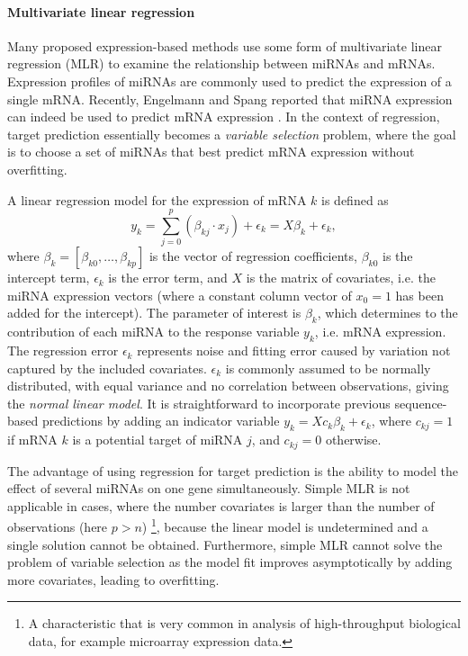 \paragraph{Multivariate linear regression}
Many proposed expression-based methods use some form of multivariate linear
regression (MLR) to examine the relationship between miRNAs and mRNAs.
Expression profiles of miRNAs are commonly used to predict the expression of a
single mRNA. Recently, Engelmann and Spang reported that miRNA expression can indeed be used to
predict mRNA expression \citep{Engelmann2012}. In the context of regression,
target prediction essentially becomes a \emph{variable selection} problem, where the
goal is to choose a set of miRNAs that best predict mRNA expression without
overfitting.

A linear regression model for the expression of mRNA $k$ is defined as
\begin{equation}
  \label{eq:linear-regression}
	y_k = \sum_{j=0}^{p} (\beta_{kj} \cdot x_j) + \epsilon_k =  X \beta_k + \epsilon_k,
\end{equation}
where $\beta_k = [\beta_{k0}, \dotsc, \beta_{kp}]$ is the vector of regression coefficients,
$\beta_{k0}$ is the intercept term, $\epsilon_k$ is the error term, and $X$ is the
matrix of covariates, i.e. the miRNA expression vectors (where a constant column
vector of $x_0=1$ has been added for the intercept). The parameter of
interest is $\beta_k$, which determines to the contribution of each miRNA to the
response variable $y_k$, i.e. mRNA expression. The regression error $\epsilon_k$
represents noise and fitting error caused by variation not captured by the
included covariates. $\epsilon_k$ is commonly assumed to be normally
distributed, with equal variance and no correlation between observations,
giving the \emph{normal linear model}. It is straightforward to incorporate previous
sequence-based predictions by adding an indicator variable $y_k = X c_k \beta_k + \epsilon_k$,
where $c_{kj} = 1$ if mRNA $k$ is a potential target of miRNA $j$, and $c_{kj} = 0$ otherwise.

The advantage of using regression for target prediction is the ability to
model the effect of several miRNAs on one gene simultaneously.
Simple MLR is not applicable in cases, where the number covariates is larger
than the number of observations (here $p > n$)
\footnote{A characteristic that is very common
in analysis of high-throughput biological data, for example microarray
expression data.}, because the linear model is
undetermined and a single solution cannot be obtained.
Furthermore, simple MLR cannot solve the problem of
variable selection as the model fit improves asymptotically
by adding more covariates, leading to overfitting.

